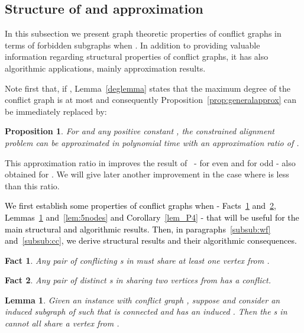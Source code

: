 \documentclass[final]{dmtcs-episciences}
\newtheorem{lemma}[theorem]{Lemma}
\newtheorem{proposition}[theorem]{Proposition}
\newtheorem{fact}{Fact}
\newcommand\mar[1]{\textcolor{black}{#1}}
\begin{document}
 


\subsection{Structure of  and approximation}\label{subsec:struct-approx}


In this subsection we present graph theoretic properties of conflict graphs in terms of forbidden subgraphs when . 
In addition to providing valuable information regarding 
structural properties of conflict graphs, it has also algorithmic applications, mainly approximation results. 

Note first that, if , Lemma~\ref{deglemma} states that the maximum degree of the conflict graph is at most  and consequently Proposition~\ref{prop:generalapprox} can be immediately replaced by:

\begin{proposition}\label{cor:approxD1}
For  and any positive constant , the constrained alignment problem can be approximated in polynomial time with an approximation ratio of
.
\end{proposition}
 
This approximation ratio in  improves the result of~\citet{Fertin200990} \-- 
for even  and  for odd 
 \-- also obtained for . We will give later another improvement in the case where  is less than this ratio. 

\mar{We first establish some  properties of conflict graphs when  \-- Facts~\ref{onenode} and~\ref{twonodes}, Lemmas~\ref{lem_H} and~\ref{lem:5nodes} and Corollary~\ref{lem_P4} \--  that will be useful for the main structural and algorithmic results. Then, in paragraphs~\ref{subsub:wf} and~\ref{subsub:cc}, we derive structural results and their algorithmic consequences. }


\begin{fact}
\label{onenode}
Any pair of conflicting s in  must share at least one vertex from .
\end{fact}

\begin{fact}
\label{twonodes}
Any pair of distinct s in  sharing two vertices from  has a conflict.
\end{fact} 


\begin{lemma}
\label{lem_H}
Given an instance  with conflict graph , suppose  and consider an induced subgraph   of  such that  is connected and  has an induced .
Then the s in  cannot all share a vertex from .
\end{lemma}
\end{document}
